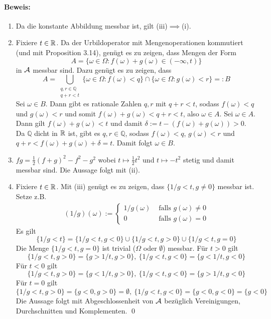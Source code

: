\documentclass[12pt]{report}
\begin{document}
  \paragraph{Beweis:}
  \begin{enumerate}[label=(\roman*)]
      \item Da die konstante Abbildung messbar ist, gilt (iii)$\implies$(i).
      \item Fixiere $t\in\mathbb{R}$. Da der Urbildoperator mit Mengenoperationen kommutiert (und mit Proposition 3.14), gen\"ugt es zu zeigen, dass Mengen der Form
      $$A=\{\omega\in\Omega:f(\omega)+g(\omega)\in(-\infty,t)\}$$
      in $\mathcal{A}$ messbar sind. Dazu gen\"ugt es zu zeigen, dass
      $$A=\bigcup_{\substack{q,r\in\mathbb{Q}\\q+r<t}}\{\omega\in\Omega:f(\omega)<q\}\cap\{\omega\in\Omega:g(\omega)<r\}=:B$$
      Sei $\omega\in B$. Dann gibt es rationale Zahlen $q,r$ mit $q+r<t$, sodass $f(\omega)<q$ und $g(\omega)<r$ und somit $f(\omega)+g(\omega)<q+r<t$, also $\omega\in A$.\newline
      Sei $\omega\in A$. Dann gilt $f(\omega)+g(\omega)<t$ und damit $\delta:=t-(f(\omega)+g(\omega))>0$. Da $\mathbb{Q}$ dicht in $\mathbb{R}$ ist, gibt es $q,r\in\mathbb{Q}$, sodass $f(\omega)<q$, $g(\omega)<r$ und $q+r<f(\omega)+g(\omega)+\delta=t$. Damit folgt $\omega\in B$.
      \item $fg=\frac{1}{2}(f+g)^2-f^2-g^2$ wobei $t\mapsto \frac{1}{2}t^2$ und $t\mapsto -t^2$ stetig und damit messbar sind. Die Aussage folgt mit (ii).
      \item Fixiere $t\in\mathbb{R}$. Mit (iii) gen\"ugt es zu zeigen, dass $\{1/g<t,g\neq0\}$ messbar ist. Setze z.B. 
      \begin{align*}
          (1/g)(\omega):=
        \begin{cases}
          1/g(\omega)&\text{ falls }g(\omega)\neq0\\
          0&\text{ falls }g(\omega)=0
        \end{cases}
      \end{align*}
      Es gilt
      $$\{1/g<t\}=\{1/g<t, g<0\}\cup\{1/g<t,g>0\}\cup\{1/g<t,g=0\}$$
      Die Menge $\{1/g<t,g=0\}$ ist trivial ($\Omega$ oder $\emptyset$) messbar. \newline
      F\"ur $t>0$ gilt 
      $$\{1/g<t,g>0\}=\{g>1/t,g>0\},\ \{1/g<t, g<0\}=\{g<1/t,g<0\} $$
      F\"ur $t<0$ gilt
      $$\{1/g<t,g>0\}=\{g<1/t,g>0\},\ \{1/g<t, g<0\}=\{g>1/t,g<0\} $$
      F\"ur $t=0$ gilt
      $$\{1/g<t,g>0\}=\{g<0,g>0\}=\emptyset,\ \{1/g<t, g<0\}=\{g<0,g<0\}=\{g<0\}$$
      Die Aussage folgt mit Abgeschlossenheit von $\mathcal{A}$ bez\"uglich Vereinigungen, Durchschnitten und Komplementen. \qed
  \end{enumerate}
  
\end{document}
